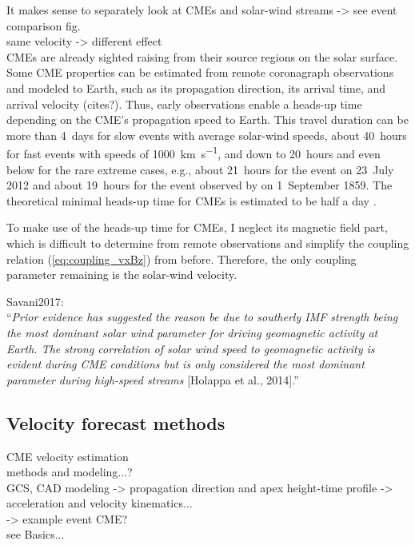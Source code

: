 It makes sense to separately look at CMEs and solar-wind streams -> see event comparison fig.\\
same velocity -> different \Kp{} effect\\

CMEs are already sighted raising from their source regions on the solar surface. Some CME properties can be estimated from remote coronagraph observations and modeled to Earth, such as its propagation direction, its arrival time, and arrival velocity (cites?). Thus, early observations enable a heads-up time depending on the CME's propagation speed to Earth. This travel duration can be more than 4~days for slow events with average solar-wind speeds, about 40~hours for fast events with speeds of \SI{1000}{\km\per\s}, and down to 20~hours and even below for the rare extreme cases, e.g., about 21~hours for the event on 23~July 2012 \citep{Russell2013,Temmer2015} and about 19~hours for the event observed by \citet{Carrington1859} on 1~September 1859. The theoretical minimal heads-up time for CMEs is estimated to be half a day \citep{Gopalswamy2005}.

To make use of the heads-up time for CMEs, I neglect its magnetic field part, which is difficult to determine from remote observations and simplify the coupling relation (\ref{eq:coupling_vxBz}) from before. Therefore, the only coupling parameter remaining is the solar-wind velocity.

Savani2017:\\
``\textit{Prior evidence has suggested the reason be due to southerly IMF strength being the most dominant solar wind parameter for driving geomagnetic activity at Earth. The strong correlation of solar wind speed to geomagnetic activity is evident during CME conditions but is only considered the most dominant parameter during high-speed streams} [Holappa et al., 2014].''\\


\subsection{Velocity forecast methods}

CME velocity estimation\\
methods and modeling...?\\
GCS, CAD modeling -> propagation direction and apex height-time profile -> acceleration and velocity kinematics...\\
-> example event CME?\\
see Basics...\\

